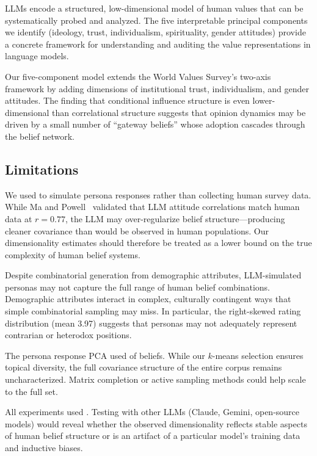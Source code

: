 LLMs encode a structured, low-dimensional model of human values that can be systematically probed and analyzed. The five interpretable principal components we identify (ideology, trust, individualism, spirituality, gender attitudes) provide a concrete framework for understanding and auditing the value representations in language models.

Our five-component model extends the World Values Survey's two-axis framework \cite{inglehart2005modernization} by adding dimensions of institutional trust, individualism, and gender attitudes. The finding that conditional influence structure is even lower-dimensional than correlational structure suggests that opinion dynamics may be driven by a small number of ``gateway beliefs'' whose adoption cascades through the belief network.

\subsection{Limitations}

We used \gptmini to simulate persona responses rather than collecting human survey data. While Ma and Powell~\cite{ma2025llm} validated that LLM attitude correlations match human data at $r = 0.77$, the LLM may over-regularize belief structure---producing cleaner covariance than would be observed in human populations. Our dimensionality estimates should therefore be treated as a lower bound on the true complexity of human belief systems.

Despite combinatorial generation from demographic attributes, LLM-simulated personas may not capture the full range of human belief combinations. Demographic attributes interact in complex, culturally contingent ways that simple combinatorial sampling may miss. In particular, the right-skewed rating distribution (mean 3.97) suggests that personas may not adequately represent contrarian or heterodox positions.

The persona response PCA used \nbeliefsub of \nbeliefs beliefs. While our $k$-means selection ensures topical diversity, the full covariance structure of the entire corpus remains uncharacterized. Matrix completion or active sampling methods could help scale to the full set.

All experiments used \gptmini. Testing with other LLMs (Claude, Gemini, open-source models) would reveal whether the observed dimensionality reflects stable aspects of human belief structure or is an artifact of a particular model's training data and inductive biases.

